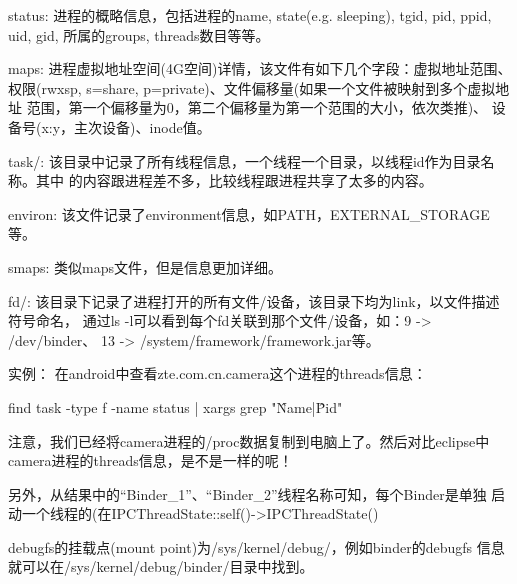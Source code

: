 ﻿\documentclass[a4paper,11pt]{article}
\begin{document}
  status: 进程的概略信息，包括进程的name, state(e.g. sleeping), tgid, pid, ppid,
  uid, gid, 所属的groups, threads数目等等。

  maps: 进程虚拟地址空间(4G空间)详情，该文件有如下几个字段：虚拟地址范围、
  权限(rwxsp, s=share, p=private)、文件偏移量(如果一个文件被映射到多个虚拟地址
  范围，第一个偏移量为0，第二个偏移量为第一个范围的大小，依次类推)、
  设备号(x:y，主次设备)、inode值。

  task/: 该目录中记录了所有线程信息，一个线程一个目录，以线程id作为目录名称。其中
  的内容跟进程差不多，比较线程跟进程共享了太多的内容。

  environ: 该文件记录了environment信息，如PATH，EXTERNAL\_STORAGE等。

  smaps: 类似maps文件，但是信息更加详细。

  fd/: 该目录下记录了进程打开的所有文件/设备，该目录下均为link，以文件描述符号命名，
  通过ls -l可以看到每个fd关联到那个文件/设备，如：9 -> /dev/binder、
  13 -> /system/framework/framework.jar等。

  \vspace{5pt}

  实例：
  在android中查看zte.com.cn.camera这个进程的threads信息：

  find task -type f -name status | xargs grep "\^Name\bs|\^Pid"

  注意，我们已经将camera进程的/proc数据复制到电脑上了。然后对比eclipse中
  camera进程的threads信息，是不是一样的呢！

  另外，从结果中的“Binder\_1”、“Binder\_2”线程名称可知，每个Binder是单独
  启动一个线程的(在IPCThreadState::self()->IPCThreadState()

  debugfs的挂载点(mount point)为/sys/kernel/debug/，例如binder的debugfs
  信息就可以在/sys/kernel/debug/binder/目录中找到。


\end{document}
